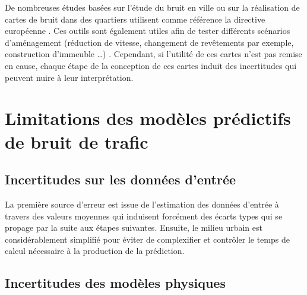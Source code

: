 De nombreuses études basées sur l'étude du bruit en ville ou sur la réalisation de cartes de bruit dans des quartiers utilisent comme référence la directive européenne \cite{murphy_environmental_2006, murphy_estimating_2009, Eriksson_residential_2013}. Ces outils sont également utiles afin de tester différents scénarios d'aménagement (réduction de vitesse, changement de revêtements par exemple, construction d'immeuble \dots) \cite{murphy2011scenario,guedes2011influence}. Cependant, si l'utilité de ces cartes n'est pas remise en cause, chaque étape de la conception de ces cartes induit des incertitudes qui peuvent nuire à leur interprétation.


\section{Limitations des modèles prédictifs de bruit de trafic}



\subsection{Incertitudes sur les données d'entrée}

La première source d'erreur est issue de l'estimation des données d'entrée à travers des valeurs moyennes qui induisent forcément des écarts types qui se propage par la suite aux étapes suivantes.
Ensuite, le milieu urbain est considérablement simplifié pour éviter de complexifier et contrôler le temps de calcul nécessaire à la production de la prédiction. 


\subsection{Incertitudes des modèles physiques}


